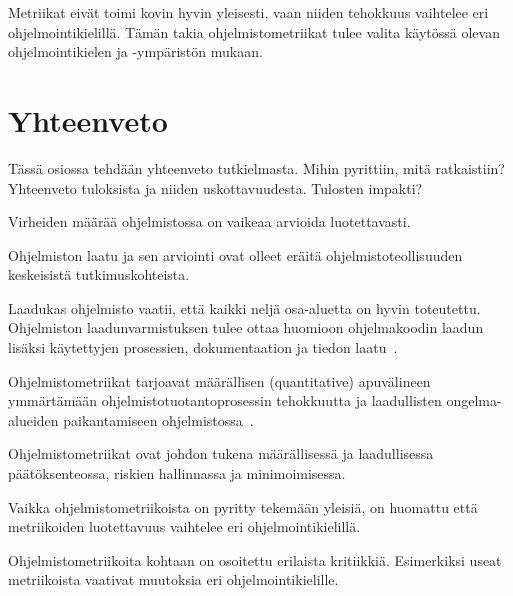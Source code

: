 \documentclass[finnish]{tktltiki2}
\theoremstyle{definition}
\theoremstyle{remark}
\begin{document}
Metriikat eivät toimi kovin hyvin yleisesti, vaan niiden tehokkuus vaihtelee eri ohjelmointikielillä. Tämän takia ohjelmistometriikat tulee valita käytössä olevan ohjelmointikielen ja -ympäristön mukaan.


\section{Yhteenveto}

Tässä osiossa tehdään yhteenveto tutkielmasta. Mihin pyrittiin, mitä ratkaistiin? Yhteenveto tuloksista ja niiden uskottavuudesta. Tulosten impakti?


Virheiden määrää ohjelmistossa on vaikeaa arvioida luotettavasti.

Ohjelmiston laatu ja sen arviointi ovat olleet eräitä ohjelmistoteollisuuden keskeisistä tutkimuskohteista.

Laadukas ohjelmisto vaatii, että kaikki neljä osa-aluetta on hyvin toteutettu. Ohjelmiston laadunvarmistuksen tulee ottaa huomioon ohjelmakoodin laadun lisäksi käytettyjen prosessien, dokumentaation ja tiedon laatu~\cite{G04}.

Ohjelmistometriikat tarjoavat määrällisen (quantitative) apuvälineen ymmärtämään ohjelmistotuotantoprosessin tehokkuutta ja laadullisten ongelma-alueiden paikantamiseen ohjelmistossa~\cite{PI92}.

Ohjelmistometriikat ovat johdon tukena määrällisessä ja laadullisessa päätöksenteossa, riskien hallinnassa ja minimoimisessa.

Vaikka ohjelmistometriikoista on pyritty tekemään yleisiä, on huomattu että metriikoiden luotettavuus vaihtelee eri ohjelmointikielillä.

Ohjelmistometriikoita kohtaan on osoitettu erilaista kritiikkiä. Esimerkiksi useat metriikoista vaativat muutoksia eri ohjelmointikielille.

%
%
% 
%







%
\end{document}
